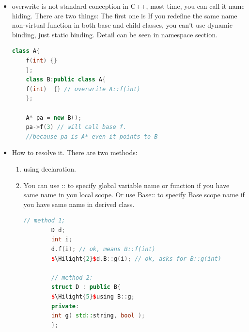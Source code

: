 \documentclass[a4paper,11pt,twoside]{book}
\newcommand{\Hilight}[1]{\makebox[0pt][l]{\color{yellow}\rule[-3pt]{#1em}{11pt}}}
\newcommand{\Hilight}[1]{}
\begin{document}
\begin{itemize}
\begin{enumerate}
	\end{enumerate}
	
	\item overwrite is not standard conception in C++, most time, you can call it name hiding. There are two things: The first one is If you redefine the same name non-virtual function in both base and child classes, you can't use dynamic binding, just static binding.  Detail can be seen in namespace section.
	\begin{lstlisting}[frame=single, language=c++]
	class A{
	f(int) {}
	};
	class B:public class A{
	f(int)  {} // overwrite A::f(int)
	};
	
	A* pa = new B();
	pa->f(3) // will call base f.
	//because pa is A* even it points to B
	\end{lstlisting}
	
	
	\item How to resolve it.  There are two methods:
	\begin{enumerate}
		\item using declaration.
		
		\item You can use :: to specify global variable name or function if you have same name in you local scope.  Or use Base:: to specify Base scope name if you have same name in derived class.
		\begin{lstlisting}[frame=single, language=c++, mathescape=true]
		// method 1;
		D d;
		int i;
		d.f(i); // ok, means B::f(int)
		$\Hilight{2}$d.B::g(i); // ok, asks for B::g(int)
		
		// method 2:
		struct D : public B{
		$\Hilight{5}$using B::g;
		private:
		int g( std::string, bool );
		};
		\end{lstlisting}
		
	\end{enumerate}
\end{itemize}
\end{document}

